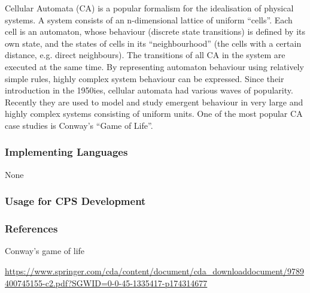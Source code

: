 


Cellular Automata (CA) is a popular formalism for the idealisation of physical systems.
A system consists of an n-dimensional lattice of uniform ``cells''. 
Each cell is an automaton, whose behaviour (discrete state transitions) is defined by its own state, and the states of cells in its ``neighbourhood'' (the cells with a certain distance, e.g. direct neighbours).
The transitions of all CA in the system are executed at the same time.
By representing automaton behaviour using relatively simple rules, highly complex system behaviour can be expressed. Since their introduction in the 1950ies, cellular automata had various waves of popularity.
Recently they are used to model and study emergent behaviour in very large and highly complex systems consisting of uniform units.
One of the most popular CA case studies is Conway's ``Game of Life''.


\subsubsection{Implementing Languages}

None

\subsubsection{Usage for CPS Development}

\cite{H2015}
\cite{Z2013}
\cite{THVP2016}


\subsubsection{References}

Conway's game of life

\url{https://www.springer.com/cda/content/document/cda_downloaddocument/9789400745155-c2.pdf?SGWID=0-0-45-1335417-p174314677}
	
